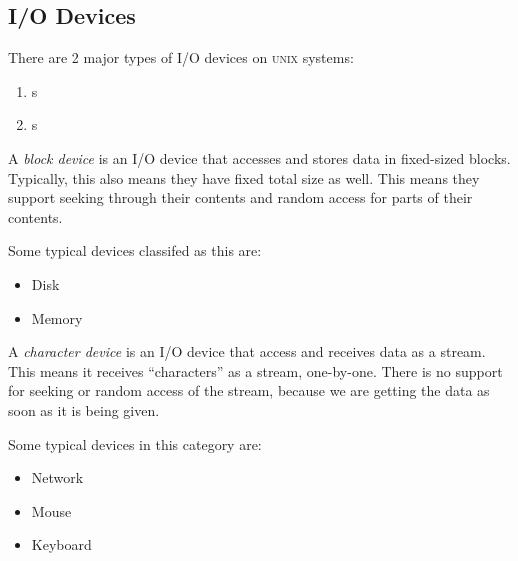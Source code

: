 \subsection{I/O Devices}\label{subsec:IO_Devices}
There are 2 major types of I/O devices on \textsc{unix} systems:
\begin{enumerate}[noitemsep]
\item {}s
\item {}s
\end{enumerate}

\begin{definition}\label{def:Block_Device}
  A \emph{block device} is an I/O device that accesses and stores data in fixed-sized blocks.
  Typically, this also means they have fixed total size as well.
  This means they support seeking through their contents and random access for parts of their contents.

  Some typical devices classifed as this are:
  \begin{itemize}[noitemsep]
  \item Disk
  \item Memory
  \end{itemize}
\end{definition}

\begin{definition}\label{def:Character_Device}
  A \emph{character device} is an I/O device that access and receives data as a stream.
  This means it receives ``characters'' as a stream, one-by-one.
  There is no support for seeking or random access of the stream, because we are getting the data as soon as it is being given.

  Some typical devices in this category are:
  \begin{itemize}[noitemsep]
  \item Network
  \item Mouse
  \item Keyboard
  \end{itemize}
\end{definition}


